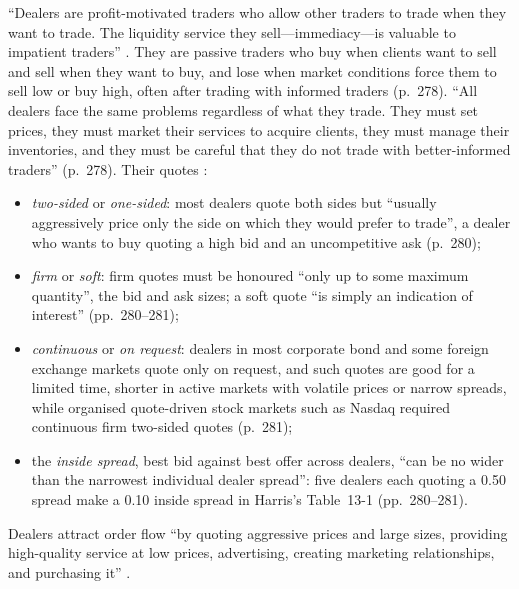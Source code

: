 \begin{qfdefinition}\label{def:dealer-quotes-order-flow}
 ``Dealers are profit-motivated traders who allow other traders to trade when they want to trade. The liquidity service they sell---immediacy---is valuable to impatient traders'' \citep[chap.~13, sec.~13.1, p.~279]{alpha-harris}. They are passive traders who buy when clients want to sell and sell when they want to buy, and lose when market conditions force them to sell low or buy high, often after trading with informed traders (p.~278). ``All dealers face the same problems regardless of what they trade. They must set prices, they must market their services to acquire clients, they must manage their inventories, and they must be careful that they do not trade with better-informed traders'' (p.~278). Their quotes \citep[same chap., sec.~13.2, pp.~280--281]{alpha-harris}:
\begin{itemize}\setlength{\itemsep}{0pt}
\item \emph{two-sided} or \emph{one-sided}: most dealers quote both sides but ``usually aggressively price only the side on which they would prefer to trade'', a dealer who wants to buy quoting a high bid and an uncompetitive ask (p.~280);
\item \emph{firm} or \emph{soft}: firm quotes must be honoured ``only up to some maximum quantity'', the bid and ask sizes; a soft quote ``is simply an indication of interest'' (pp.~280--281);
\item \emph{continuous} or \emph{on request}: dealers in most corporate bond and some foreign exchange markets quote only on request, and such quotes are good for a limited time, shorter in active markets with volatile prices or narrow spreads, while organised quote-driven stock markets such as Nasdaq required continuous firm two-sided quotes (p.~281);
\item the \emph{inside spread}, best bid against best offer across dealers, ``can be no wider than the narrowest individual dealer spread'': five dealers each quoting a 0.50 spread make a 0.10 inside spread in Harris's Table~13-1 (pp.~280--281).
\end{itemize}
Dealers attract order flow ``by quoting aggressive prices and large sizes, providing high-quality service at low prices, advertising, creating marketing relationships, and purchasing it'' \citep[same chap., sec.~13.4, pp.~282--283]{alpha-harris}.


\end{qfdefinition}
